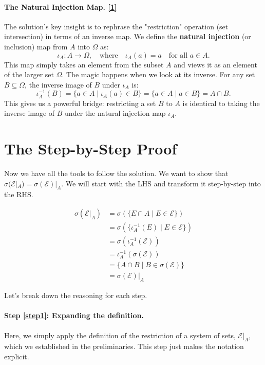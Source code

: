 \documentclass[11pt,a4paper]{article}
\begin{document}
\paragraph{The Natural Injection Map. \hyperref[exp3]{[1]}} The solution's key insight is to rephrase the "restriction" operation (set intersection) in terms of an inverse map. We define the \textbf{natural injection} (or inclusion) map from $A$ into $\Omega$ as:
\[
    \iota_A: A \to \Omega, \quad \text{where} \quad \iota_A(a) = a \quad \text{for all } a \in A.
\]
This map simply takes an element from the subset $A$ and views it as an element of the larger set $\Omega$. The magic happens when we look at its inverse. For any set $B \subseteq \Omega$, the inverse image of $B$ under $\iota_A$ is:
\[
    \iota_A^{-1}(B) = \{a \in A \mid \iota_A(a) \in B\} = \{a \in A \mid a \in B\} = A \cap B.
\]
This gives us a powerful bridge: restricting a set $B$ to $A$ is identical to taking the inverse image of $B$ under the natural injection map $\iota_A$.

\section{The Step-by-Step Proof}

Now we have all the tools to follow the solution. We want to show that $\sigma(\mathcal{E}|_A) = \sigma(\mathcal{E})|_A$. We will start with the LHS and transform it step-by-step into the RHS.

\begin{align}
    \sigma(\mathcal{E}|_A) &= \sigma\left( \{E \cap A \mid E \in \mathcal{E}\} \right) \label{step1} \\
    &= \sigma\left( \{\iota_A^{-1}(E) \mid E \in \mathcal{E}\} \right) \label{step2} \\
    &= \sigma\left( \iota_A^{-1}(\mathcal{E}) \right) \label{step3} \\
    &= \iota_A^{-1}\left( \sigma(\mathcal{E}) \right) \label{step4} \\
    &= \{A \cap B \mid B \in \sigma(\mathcal{E})\} \label{step5} \\
    &= \sigma(\mathcal{E})|_A \label{step6}
\end{align}

Let's break down the reasoning for each step.

\paragraph{Step \eqref{step1}: Expanding the definition.}
Here, we simply apply the definition of the restriction of a system of sets, $\mathcal{E}|_A$, which we established in the preliminaries. This step just makes the notation explicit.
\end{document}

